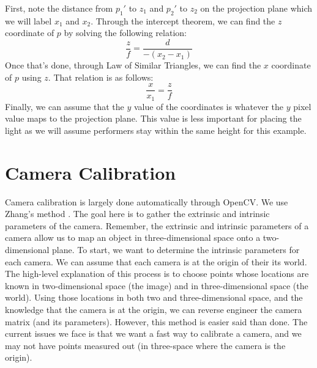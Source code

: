 \documentclass[
    12pt,
    twoside,
    bibstyle=chicago,
    headerstyle=uppercase,
	bibfile=biblatex_updating.bib
]{reedthesis}
\begin{document}
First, note the distance from $p_1'$ to $z_1$ and $p_2'$ to $z_2$ on the projection plane which we will label $x_1$ and $x_2$. Through the intercept theorem, we can find the $z$ coordinate of $p$ by solving the following relation:
\[\frac{z}{f} = \frac{d}{-(x_2 - x_1)}\]
Once that's done, through Law of Similar Triangles, we can find the $x$ coordinate of $p$ using $z$. That relation is as follows:
\[\frac{x}{x_1}=\frac{z}{f}\]
Finally, we can assume that the $y$ value of the coordinates is whatever the $y$ pixel value maps to the projection plane. This value is less important for placing the light as we will assume performers stay within the same height for this example.

\section{Camera Calibration}
Camera calibration is largely done automatically through OpenCV. We use Zhang's method \autocite{zhangFlexibleNewTechnique2000a}. The goal here is to gather the extrinsic and intrinsic parameters of the camera. Remember, the extrinsic and intrinsic parameters of a camera allow us to map an object in three-dimensional space onto a two-dimensional plane. To start, we want to determine the intrinsic parameters for each camera. We can assume that each camera is at the origin of their its world. The high-level explanation of this process is to choose points whose locations are known in two-dimensional space (the image) and in three-dimensional space (the world). Using those locations in both two and three-dimensional space, and the knowledge that the camera is at the origin, we can reverse engineer the camera matrix (and its parameters). However, this method is easier said than done. The current issues we face is that we want a fast way to calibrate a camera, and we may not have points measured out (in three-space where the camera is the origin).
\end{document}
